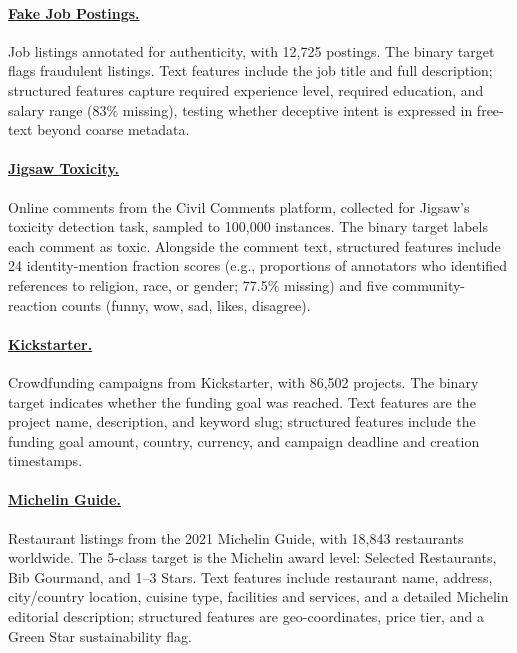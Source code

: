 \paragraph{\href{https://www.openml.org/search?type=data&id=46655}{Fake Job Postings.}} Job listings annotated for authenticity, with 12,725 postings.
The binary target flags fraudulent listings.
Text features include the job title and full description; structured features capture required experience level, required education, and salary range (83\% missing), testing whether deceptive intent is expressed in free-text beyond coarse metadata.

\paragraph{\href{https://www.openml.org/search?type=data&id=46654}{Jigsaw Toxicity.}} Online comments from the Civil Comments platform, collected for Jigsaw's toxicity detection task, sampled to 100,000 instances.
The binary target labels each comment as toxic.
Alongside the comment text, structured features include 24 identity-mention fraction scores (e.g., proportions of annotators who identified references to religion, race, or gender; 77.5\% missing) and five community-reaction counts (funny, wow, sad, likes, disagree).

\paragraph{\href{https://www.openml.org/search?type=data&id=46668}{Kickstarter.}} Crowdfunding campaigns from Kickstarter, with 86,502 projects.
The binary target indicates whether the funding goal was reached.
Text features are the project name, description, and keyword slug; structured features include the funding goal amount, country, currency, and campaign deadline and creation timestamps.

\paragraph{\href{https://www.kaggle.com/datasets/ngshiheng/michelin-guide-restaurants-2021}{Michelin Guide.}} Restaurant listings from the 2021 Michelin Guide, with 18,843 restaurants worldwide.
The 5-class target is the Michelin award level: Selected Restaurants, Bib Gourmand, and 1--3 Stars.
Text features include restaurant name, address, city/country location, cuisine type, facilities and services, and a detailed Michelin editorial description; structured features are geo-coordinates, price tier, and a Green Star sustainability flag.

